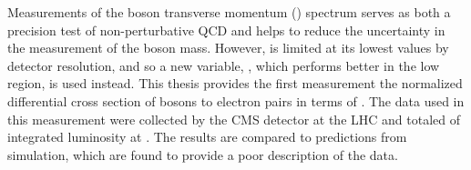 
Measurements of the \Z boson transverse momentum (\bosonpt) spectrum serves as
both a precision test of non-perturbative QCD and helps to reduce the
uncertainty in the measurement of the \W boson mass. However, \bosonpt is
limited at its lowest values by detector resolution, and so a new variable,
\phistar, which performs better in the low \bosonpt region, is used instead.
This thesis provides the first measurement the normalized differential cross
section of \Z bosons to electron pairs in terms of \phistar. The data used in
this measurement were collected by the CMS detector at the LHC and totaled
\GoodLumiNumber of integrated luminosity at \rootseight.  The results are
compared to predictions from simulation, which are found to provide a poor
description of the data.
